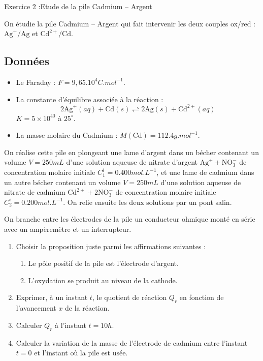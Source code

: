 \documentclass[12pt, french]{article}
\begin{document}
\begin{Box2}{Exercice 2 :Etude de la pile Cadmium – Argent }

On étudie la pile Cadmium – Argent qui fait intervenir les deux couples ox/red : $\text{Ag}^+/\text{Ag}$ et $\text{Cd}^{2+}/\text{Cd}$.

\subsection*{Données} 
\begin{itemize}
  \item Le Faraday : $F = 9,65.10^{4}{C.mol^{-1}}$.
    \item La constante d’équilibre associée à la réaction :
    \begin{equation}
        2\text{Ag}^+(aq) + \text{Cd}(s) \rightleftharpoons 2\text{Ag}(s) + \text{Cd}^{2+}(aq)
    \end{equation}
    $K = 5 \times 10^{40}$ à ${25^{\circ}}$.
    \item La masse molaire du Cadmium : $M(\text{Cd}) = {112.4}{g.mol^{-1}}$.
\end{itemize}

On réalise cette pile en plongeant une lame d’argent dans un bécher contenant un volume $V = {250}{mL}$ d’une solution aqueuse de nitrate d’argent $\text{Ag}^+ + \text{NO}_3^-$ de concentration molaire initiale $C_1^i = {0.400}{mol.L^{-1}}$, et une lame de cadmium dans un autre bécher contenant un volume $V = {250}{mL}$ d’une solution aqueuse de nitrate de cadmium $\text{Cd}^{2+} + 2\text{NO}_3^-$ de concentration molaire initiale $C_2^i = {0.200}{mol.L^{-1}}$. On relie ensuite les deux solutions par un pont salin.

On branche entre les électrodes de la pile un conducteur ohmique monté en série avec un ampèremètre et un interrupteur.

\begin{enumerate}
    \item Choisir la proposition juste parmi les affirmations suivantes :
    \begin{enumerate}
        \item Le pôle positif de la pile est l’électrode d’argent.
        \item L’oxydation se produit au niveau de la cathode.
    \end{enumerate}
    \item Exprimer, à un instant $t$, le quotient de réaction $Q_r$ en fonction de l’avancement $x$ de la réaction.
    \item Calculer $Q_r$ à l’instant $t = 10h$.
    \item Calculer la variation de la masse de l’électrode de cadmium entre l’instant $t=0$ et l’instant où la pile est usée.
\end{enumerate}

\end{Box2}
\end{document}
